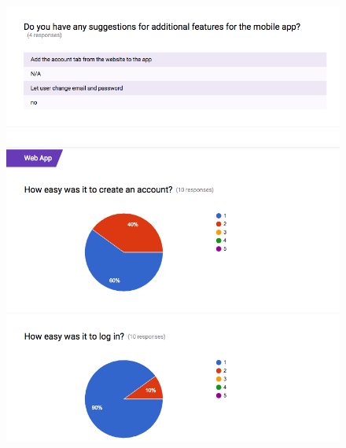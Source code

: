 \documentclass[11pt,openright,a4paper]{report}
\begin{document}
\begin{appendices}
\begin{figure}[ht]
  \centering
  \includegraphics[width=.9\textwidth]{i/testingresponses6.png}
  \includegraphics[width=.9\textwidth]{i/testingresponses7.png}
\end{figure}


\end{appendices}
\end{document}
